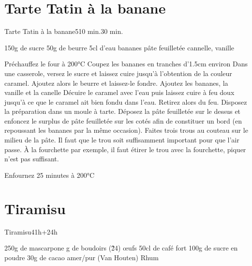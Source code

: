 {\section{Tarte Tatin à la banane}
\begin{recette}{Tarte Tatin à la banane}{5}{10 min.}{30 min.}
\begin{ingredients}
\ingredient 150g de sucre
\ingredient 50g de beurre
\ingredient 5cl d'eau
 bananes
 pâte feuilletée
\ingredient cannelle, vanille
\end{ingredients}

\begin{preparation}
\etape Préchauffez le four à 200°C
\etape Coupez les bananes en tranches d'1.5cm environ
\etape Dans une casserole, versez le sucre et laissez cuire jusqu'à l'obtention de la couleur caramel. 
\etape Ajoutez alors le beurre et laissez-le fondre. 
\etape Ajoutez les bananes, la vanille et la canelle
\etape Décuire le caramel avec l'eau puis laissez cuire à feu doux jusqu'à ce que le caramel ait bien fondu dans l'eau. Retirez 
alors du feu. 
\etape Disposez la préparation dans un moule à tarte. 
\etape Déposez la pâte feuilletée sur le dessus et enfoncez le surplus de pâte feuilletée sur les cotés afin de constituer un 
bord (en repoussant les bananes par la même occasion).
\etape Faites trois trous au couteau sur le milieu de la pâte. Il faut que le trou soit suffisamment important pour que l'air 
passe. À la fourchette par exemple, il faut étirer le trou avec la fourchette, piquer n'est pas suffisant.
\end{preparation}

\begin{cuisson}
Enfournez 25 minutes à 200°C
\end{cuisson}
\end{recette}

\section{Tiramisu}
\begin{recette}{Tiramisu}{4}{1h+24h}{}
\begin{ingredients}
\ingredient 250g de mascarpone
 g de boudoirs (\~ 24)
 œufs
\ingredient 50cl de café fort
\ingredient 100g de sucre en poudre
\ingredient 30g de cacao amer/pur (Van Houten)
\ingredient Rhum
\end{ingredients}


\end{recette}}
